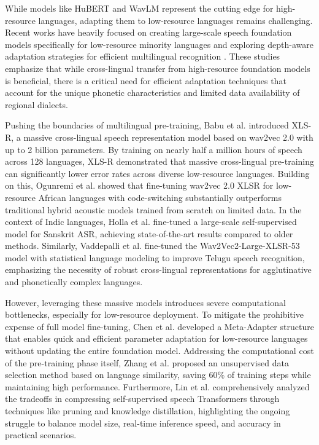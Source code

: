 While models like HuBERT and WavLM represent the cutting edge for high-resource languages, adapting them to low-resource languages remains challenging. Recent works have heavily focused on creating large-scale speech foundation models specifically for low-resource minority languages \cite{large_scale_minority} and exploring depth-aware adaptation strategies for efficient multilingual recognition \cite{adapting_where_it_matters}. These studies emphasize that while cross-lingual transfer from high-resource foundation models is beneficial, there is a critical need for efficient adaptation techniques that account for the unique phonetic characteristics and limited data availability of regional dialects. 

Pushing the boundaries of multilingual pre-training, Babu et al. \cite{babu2021xlsr} introduced XLS-R, a massive cross-lingual speech representation model based on wav2vec 2.0 with up to 2 billion parameters. By training on nearly half a million hours of speech across 128 languages, XLS-R demonstrated that massive cross-lingual pre-training can significantly lower error rates across diverse low-resource languages. Building on this, Ogunremi et al. \cite{ogunremi2023multilingual} showed that fine-tuning wav2vec 2.0 XLSR for low-resource African languages with code-switching substantially outperforms traditional hybrid acoustic models trained from scratch on limited data. In the context of Indic languages, Holla et al. \cite{holla2022end} fine-tuned a large-scale self-supervised model for Sanskrit ASR, achieving state-of-the-art results compared to older methods. Similarly, Vaddepalli et al. \cite{vaddepalli2026multilingual} fine-tuned the Wav2Vec2-Large-XLSR-53 model with statistical language modeling to improve Telugu speech recognition, emphasizing the necessity of robust cross-lingual representations for agglutinative and phonetically complex languages.

However, leveraging these massive models introduces severe computational bottlenecks, especially for low-resource deployment. To mitigate the prohibitive expense of full model fine-tuning, Chen et al. \cite{chen2024meta} developed a Meta-Adapter structure that enables quick and efficient parameter adaptation for low-resource languages without updating the entire foundation model. Addressing the computational cost of the pre-training phase itself, Zhang et al. \cite{zhang2023fast} proposed an unsupervised data selection method based on language similarity, saving 60\% of training steps while maintaining high performance. Furthermore, Lin et al. \cite{lin2022smaller} comprehensively analyzed the tradeoffs in compressing self-supervised speech Transformers through techniques like pruning and knowledge distillation, highlighting the ongoing struggle to balance model size, real-time inference speed, and accuracy in practical scenarios.

